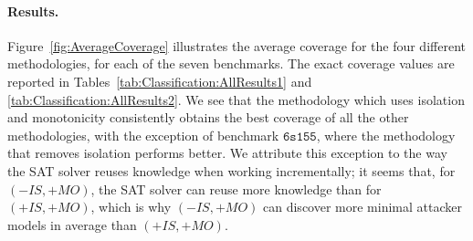 \paragraph{Results.} Figure~\ref{fig:AverageCoverage} illustrates the average coverage for the four different methodologies, for each of the seven benchmarks. The exact coverage values are reported in Tables~\ref{tab:Classification:AllResults1} and \ref{tab:Classification:AllResults2}. We see that the methodology which uses isolation and monotonicity consistently obtains the best coverage of all the other methodologies, with the exception of benchmark $\mathtt{6s155}$, where the methodology that removes isolation performs better. We attribute this exception to the way the SAT solver reuses knowledge when working incrementally; it seems that, for $(-IS,+MO)$, the SAT solver can reuse more knowledge than for $(+IS,+MO)$, which is why $(-IS,+MO)$ can discover more minimal attacker models in average than $(+IS,+MO)$. 

